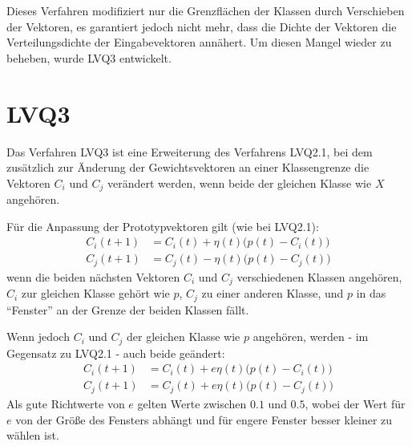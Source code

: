 Dieses Verfahren modifiziert nur die Grenzflächen der Klassen durch Verschieben der Vektoren, es garantiert jedoch nicht mehr, dass die Dichte
der Vektoren die Verteilungsdichte der Eingabevektoren annähert. Um diesen Mangel wieder zu beheben, wurde LVQ3 entwickelt.


\section*{LVQ3}
Das Verfahren LVQ3 ist eine Erweiterung des Verfahrens LVQ2.1, bei dem zusätzlich zur Änderung der Gewichtsvektoren an einer Klassengrenze die Vektoren $C_i$ und $C_j$ verändert werden, wenn beide der gleichen Klasse wie $X$ angehören.

Für die Anpassung der Prototypvektoren gilt (wie bei LVQ2.1):
\begin{align*}
	C_i(t+1) &= C_i(t) + \eta(t) \Big( p(t) - C_i(t) \Big) \\
	C_j(t+1) &= C_j(t) - \eta(t) \Big( p(t) - C_j(t) \Big)
\end{align*}
wenn die beiden nächsten Vektoren $C_i$ und $C_j$ verschiedenen Klassen angehören, $C_i$ zur gleichen Klasse gehört wie $p$, $C_j$ zu einer anderen Klasse, und $p$ in das "`Fenster"' an der Grenze der beiden Klassen fällt.

Wenn jedoch $C_i$ und $C_j$ der gleichen Klasse wie $p$ angehören, werden - im Gegensatz zu LVQ2.1 - auch beide geändert:
\begin{align*}
	C_i(t+1) &= C_i(t) + e \eta(t) \Big( p(t) - C_i(t) \Big) \\
	C_j(t+1) &= C_j(t) + e \eta(t) \Big( p(t) - C_j(t) \Big)
\end{align*}
Als gute Richtwerte von $e$ gelten Werte zwischen $0.1$ und $0.5$, wobei der Wert für $e$ von der Größe des Fensters abhängt und für engere Fenster besser kleiner zu wählen ist.


